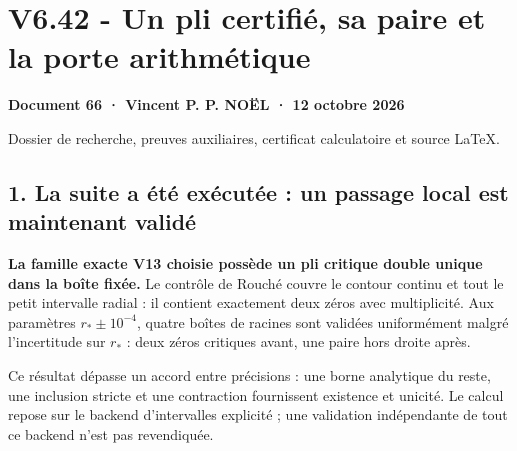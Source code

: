 \documentclass[
  10pt,
  a4paper,
]{article}
\author{}
\date{}
\begin{document}
\hypertarget{v6.42---un-pli-certifiuxe9-sa-paire-et-la-porte-arithmuxe9tique}{%
\section{V6.42 - Un pli certifié, sa paire et la porte
arithmétique}\label{v6.42---un-pli-certifiuxe9-sa-paire-et-la-porte-arithmuxe9tique}}

\textbf{Document 66 · Vincent P. P. NOËL · 12 octobre 2026}

Dossier de recherche, preuves auxiliaires, certificat calculatoire et
source LaTeX.

\hypertarget{la-suite-a-uxe9tuxe9-exuxe9cutuxe9e-un-passage-local-est-maintenant-validuxe9}{%
\subsection{1. La suite a été exécutée : un passage local est maintenant
validé}\label{la-suite-a-uxe9tuxe9-exuxe9cutuxe9e-un-passage-local-est-maintenant-validuxe9}}

\textbf{La famille exacte V13 choisie possède un pli critique double
unique dans la boîte fixée.} Le contrôle de Rouché couvre le contour
continu et tout le petit intervalle radial : il contient exactement deux
zéros avec multiplicité. Aux paramètres \(r_*\pm10^{-4}\), quatre boîtes
de racines sont validées uniformément malgré l'incertitude sur \(r_*\) :
deux zéros critiques avant, une paire hors droite après.

Ce résultat dépasse un accord entre précisions : une borne analytique du
reste, une inclusion stricte et une contraction fournissent existence et
unicité. Le calcul repose sur le backend d'intervalles explicité ; une
validation indépendante de tout ce backend n'est pas revendiquée.
\end{document}

